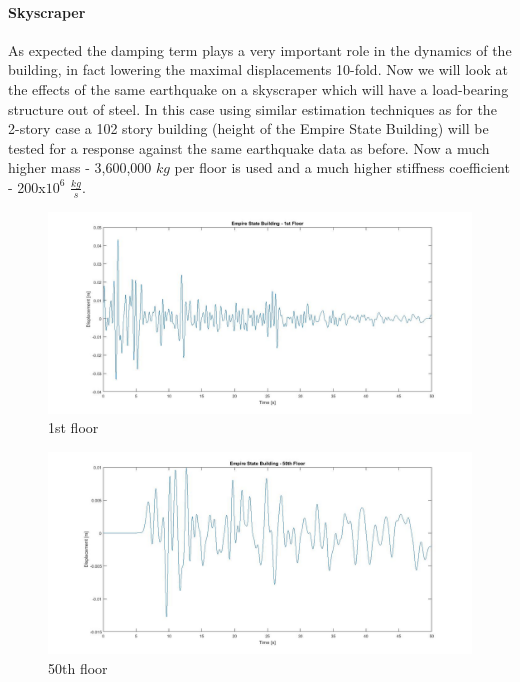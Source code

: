 \documentclass{article}
\begin{document}
	\paragraph{Skyscraper}As expected the damping term plays a very important role in the dynamics of the building, in fact lowering the maximal displacements 10-fold. Now we will look at the effects of the same earthquake on a skyscraper which will have a load-bearing structure out of steel. In this case using similar estimation techniques as for the 2-story case a 102 story building (height of the Empire State Building) will be tested for a response against the same earthquake data as before. Now a much higher mass - 3,600,000 $kg$ per floor is used and a much higher stiffness coefficient - 200x$10^6$ $\frac{kg}{s}$.
				

				\begin{figure}[h!]
   					\centering
   					\includegraphics[width=142mm]{pictures/EmpireState.jpg}
					\caption{1st floor}
					\label{EmpireState}
  				\end{figure}

				\begin{figure}[h!]
   					\centering
					\includegraphics[width=142mm]{pictures/EmpireState50.jpg}
					\caption{50th floor}
					\label{EmpireState50}
  				\end{figure}
\end{document}
